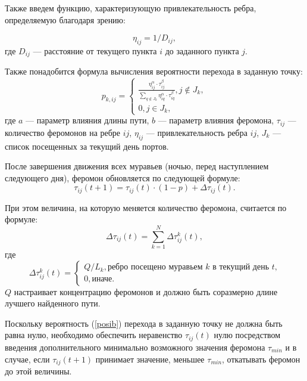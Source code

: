 Также введем функцию, характеризующую привлекательность ребра, определяемую благодаря зрению:

\begin{equation}
	\label{d_func}
	\eta_{ij} = 1 / D_{ij},
\end{equation}
где $D_{ij}$ — расстояние от текущего пункта $i$ до заданного пункта $j$.


Также понадобится формула вычисления вероятности перехода в заданную точку:
\begin{equation}
	\label{posib}
	p_{k,ij} = \begin{cases}
		\frac{\eta_{ij}^{\alpha}\cdot\tau_{ij}^{\beta}}{\sum_{q\notin J_k} \eta^\alpha_{iq}\cdot\tau^\beta_{iq}}, j \notin J_k, \\
		0, j \in J_k,
	\end{cases}
\end{equation}
где $a$ --- параметр влияния длины пути, $b$ --- параметр влияния феромона, $\tau_{ij}$ --- количество феромонов на ребре $ij$, $\eta_{ij}$ --- привлекательность ребра $ij$, $J_k$ --- список посещенных за текущий день портов.

После завершения движения всех муравьев (ночью, перед наступлением следующего дня), феромон обновляется по следующей формуле:
\begin{equation}
	\label{update_phero_1}
	\tau_{ij}(t+1) = \tau_{ij}(t)\cdot(1-p) + \Delta \tau_{ij}(t).
\end{equation}

При этом величина, на которую меняется количество феромона, считается по формуле:
\begin{equation}
	\label{update_phero_2}
	\Delta \tau_{ij}(t) = \sum_{k=1}^N \Delta \tau^k_{ij}(t),
\end{equation}
где
\begin{equation}
	\label{update_phero_3}
	\Delta\tau^k_{ij}(t) = \begin{cases}
		Q/L_{k}, \textrm{ребро посещено муравьем $k$ в текущий день $t$,} \\
		0, \textrm{иначе}.
	\end{cases}
\end{equation}
$Q$ настраивает концентрацию феромонов и должно быть соразмерно длине лучшего найденного пути.

Поскольку вероятность (\ref{posib}) перехода в заданную точку не должна быть равна нулю, необходимо обеспечить неравенство $\tau_{ij} (t)$ нулю посредством введения дополнительного минимально возможного значения феромона $\tau_{min}$ и в случае, если $\tau_{ij} (t+1)$ принимает значение, меньшее $\tau_{min}$, откатывать феромон до этой величины.



